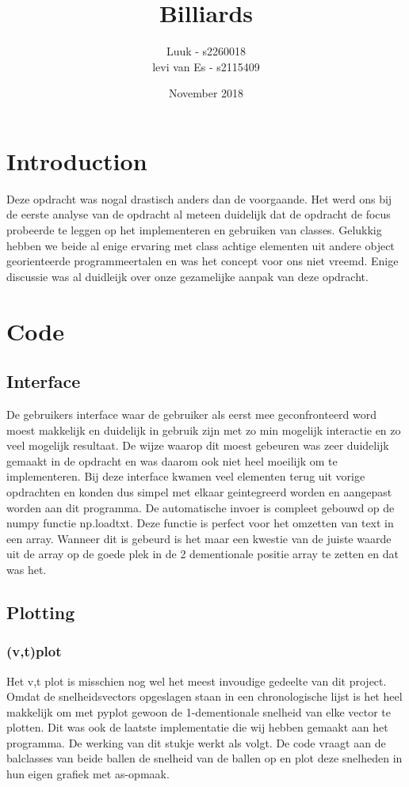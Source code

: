 \documentclass{article}
\title{Billiards}
\author{Luuk - s2260018\\levi van Es - s2115409 }
\date{November 2018}
\begin{document}
\maketitle

\section{Introduction}
    Deze opdracht was nogal drastisch anders dan de voorgaande. Het werd ons bij de eerste analyse van de opdracht al meteen duidelijk dat de opdracht de focus probeerde te leggen op het implementeren en gebruiken van classes. Gelukkig hebben we beide al enige ervaring met class achtige elementen uit andere object georienteerde programmeertalen en was het concept voor ons niet vreemd. Enige discussie was al duidleijk over onze gezamelijke aanpak van deze opdracht. 
    
\section{Code}
\subsection{Interface} 
De gebruikers interface waar de gebruiker als eerst mee geconfronteerd word moest makkelijk en duidelijk in gebruik zijn met zo min mogelijk interactie en zo veel mogelijk resultaat. De wijze waarop dit moest gebeuren was zeer duidelijk gemaakt in de opdracht en was daarom ook niet heel moeilijk om te implementeren. Bij deze interface kwamen veel elementen terug uit vorige opdrachten en konden dus simpel met elkaar geintegreerd worden en aangepast worden aan dit programma. \newline De automatische invoer is compleet gebouwd op de numpy functie np.loadtxt. Deze functie is perfect voor het omzetten van text in een array. Wanneer dit is gebeurd is het maar een kwestie van de juiste waarde uit de array op de goede plek in de 2 dementionale positie array te zetten en dat was het.
\subsection{Plotting}
\subsubsection{(v,t)plot}
Het v,t plot is misschien nog wel het meest invoudige gedeelte van dit project. Omdat de snelheidsvectors opgeslagen staan in een chronologische lijst is het heel makkelijk om met pyplot gewoon de 1-dementionale snelheid van elke vector te plotten. Dit was ook de laatste implementatie die wij hebben gemaakt aan het programma. De werking van dit stukje werkt als volgt. De code vraagt aan de balclasses van beide ballen de snelheid van de ballen op en plot deze snelheden in hun eigen grafiek met as-opmaak.  
\end{document}
